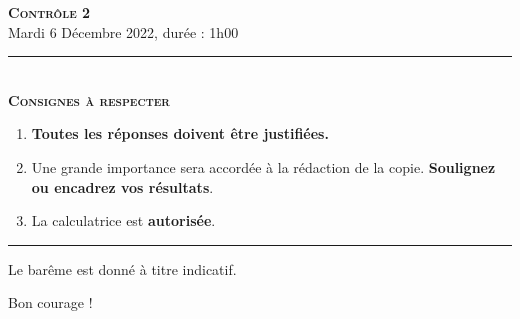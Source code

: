 \documentclass[11pt]{article}
\begin{document}

\begin{center}
\textbf{\LARGE \textsc{Contrôle 2}}\\[2mm]

{\large Mardi 6 Décembre 2022, durée : 1h00}\\[1mm]
\noindent\rule{8cm}{0.4pt}\\[1mm]
\textbf{\textsc{Consignes à respecter}}
\begin{enumerate}[label=\textbf{\arabic*/}]
\item \textbf{Toutes les réponses doivent être justifiées.}
\item Une grande importance sera accordée à la rédaction de la
  copie. \textbf{Soulignez ou encadrez vos résultats}.
\item La calculatrice est \textbf{autorisée}.
    \end{enumerate}
\noindent\rule{12cm}{0.4pt}
\end{center}

\vspace{2mm}
\noindent Le barême est donné à titre indicatif.
\vspace{2mm}
\begin{center}
  Bon courage !
\end{center}
\end{document}

